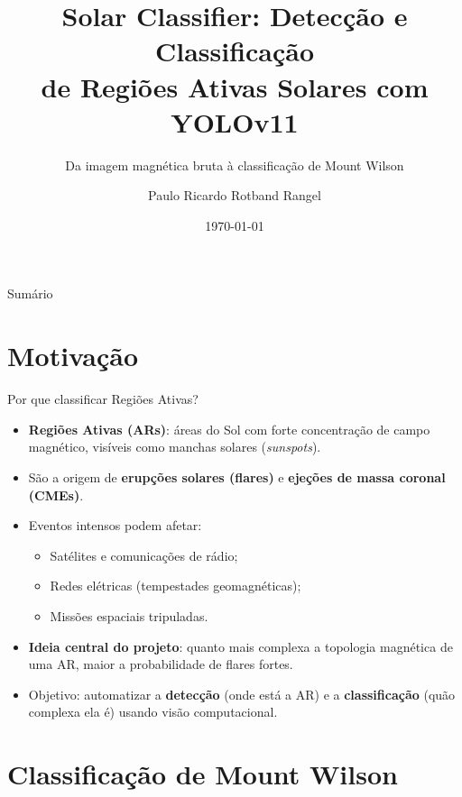 \documentclass[aspectratio=169]{beamer}
\title[Solar Classifier]{Solar Classifier: Detecção e Classificação\\de Regiões Ativas Solares com YOLOv11}
\subtitle{Da imagem magnética bruta à classificação de Mount Wilson}
\author{Paulo Ricardo Rotband Rangel}
\date{\today}
\begin{document}
\begin{frame}
  \titlepage
\end{frame}

\begin{frame}{Sumário}
  \tableofcontents
\end{frame}

\section{Motivação}

\begin{frame}{Por que classificar Regiões Ativas?}
  \begin{itemize}
    \item \textbf{Regiões Ativas (ARs)}: áreas do Sol com forte concentração de campo magnético, visíveis como manchas solares (\emph{sunspots}).
    \item São a origem de \textbf{erupções solares (flares)} e \textbf{ejeções de massa coronal (CMEs)}.
    \item Eventos intensos podem afetar:
    \begin{itemize}
      \item Satélites e comunicações de rádio;
      \item Redes elétricas (tempestades geomagnéticas);
      \item Missões espaciais tripuladas.
    \end{itemize}
    \item \textbf{Ideia central do projeto}: quanto mais complexa a topologia magnética de uma AR, maior a probabilidade de flares fortes.
    \item Objetivo: automatizar a \textbf{detecção} (onde está a AR) e a \textbf{classificação} (quão complexa ela é) usando visão computacional.
  \end{itemize}
\end{frame}

\section{Classificação de Mount Wilson}
\end{document}

